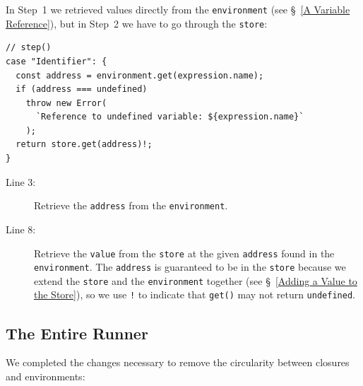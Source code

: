 \documentclass[12pt, oneside]{book}
\begin{document}
In Step~1 we retrieved values directly from the \texttt{environment} (see §~\ref{A Variable Reference}), but in Step~2 we have to go through the \texttt{store}:

\begin{verbatim}
// step()
case "Identifier": {
  const address = environment.get(expression.name);
  if (address === undefined)
    throw new Error(
      `Reference to undefined variable: ${expression.name}`
    );
  return store.get(address)!;
}
\end{verbatim}

\begin{description}
\item [Line 3:] Retrieve the \texttt{address} from the \texttt{environment}.

\item [Line 8:] Retrieve the \texttt{value} from the \texttt{store} at the given \texttt{address} found in the \texttt{environment}. The \texttt{address} is guaranteed to be in the \texttt{store} because we extend the \texttt{store} and the \texttt{environment} together (see §~\ref{Adding a Value to the Store}), so we use \texttt{!} to indicate that \texttt{get()} may not return \texttt{undefined}.
\end{description}

\subsection{The Entire Runner}

We completed the changes necessary to remove the circularity between closures and environments:
\end{document}
